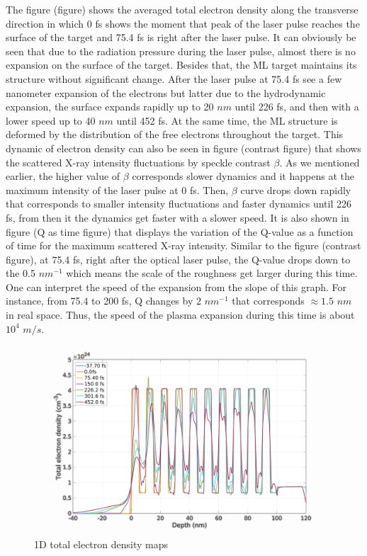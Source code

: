 \documentclass[preprint, 12pt]{elsarticle}
\begin{document}
The figure (figure) shows the averaged total electron density along the transverse direction in which 0 fs shows the moment that peak of the laser pulse reaches the surface of the target and 75.4 fs is right after the laser pulse. It can obviously be seen that due to the radiation pressure during the laser pulse, almost there is no expansion on the surface of the target. Besides that, the ML target maintains its structure without significant change. After the laser pulse at 75.4 fs see a few nanometer expansion of the electrons but latter due to the hydrodynamic expansion, the surface expands rapidly up to 20 $nm$  until 226 fs, and then with a lower speed up to 40 $nm$ until 452 fs. At the same time, the ML structure is deformed by the distribution of the free electrons throughout the target. This dynamic of electron density can also be seen in figure (contrast figure) that shows the scattered X-ray intensity fluctuations by speckle contrast $\beta$. As we mentioned earlier, the higher value of $\beta$ corresponds slower dynamics and it happens at the maximum intensity of the laser pulse at 0 fs. Then, $\beta$ curve drops down rapidly that corresponds to smaller intensity fluctuations and faster dynamics until 226 fs, from then it the dynamics get faster with a slower speed. It is also shown in figure (Q as time figure) that displays the variation of the Q-value as a function of time for the maximum scattered X-ray intensity. Similar to the figure (contrast figure), at 75.4 fs, right after the optical laser pulse, the Q-value drops down to the 0.5 $nm^{-1}$ which means the scale of the roughness get larger during this time. One can interpret the speed of the expansion from the slope of this graph. For instance, from 75.4 to 200 fs, Q changes by 2 $nm^{-1}$ that corresponds $\approx 1.5$ $nm$ in real space. Thus, the speed of the plasma expansion during this time is about $10^{4}$ $m/s$.

\begin{figure}[h]
\centering\includegraphics[width=0.8\linewidth]{Paper_plot_1D.png}
\caption{1D total electron density maps}
\end{figure}
\end{document}
